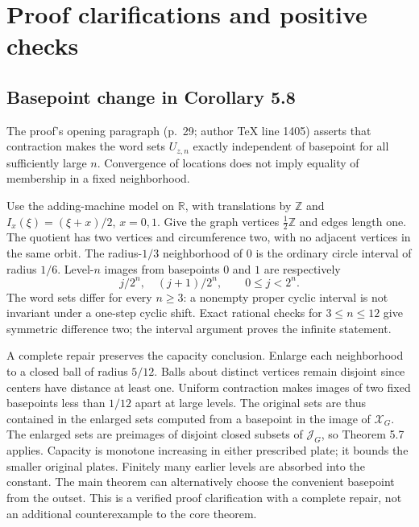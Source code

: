 \documentclass[10pt]{article}
\begin{document}
\section*{Proof clarifications and positive checks}
\subsection*{Basepoint change in Corollary 5.8}
The proof’s opening paragraph (p. 29; author TeX line 1405) asserts that contraction makes the word sets \(U_{z,n}\) exactly independent of basepoint for all sufficiently large \(n\). Convergence of locations does not imply equality of membership in a fixed neighborhood.\par
Use the adding-machine model on \(\mathbb R\), with translations by \(\mathbb Z\) and \(I_x(\xi)=(\xi+x)/2\), \(x=0,1\). Give the graph vertices \(\frac12\mathbb Z\) and edges length one. The quotient has two vertices and circumference two, with no adjacent vertices in the same orbit. The radius-\(1/3\) neighborhood of \(0\) is the ordinary circle interval of radius \(1/6\). Level-\(n\) images from basepoints \(0\) and \(1\) are respectively \[j/2^n,\quad (j+1)/2^n,\qquad 0\le j<2^n.\] The word sets differ for every \(n\ge3\): a nonempty proper cyclic interval is not invariant under a one-step cyclic shift. Exact rational checks for \(3\le n\le12\) give symmetric difference two; the interval argument proves the infinite statement.\par
A complete repair preserves the capacity conclusion. Enlarge each neighborhood to a closed ball of radius \(5/12\). Balls about distinct vertices remain disjoint since centers have distance at least one. Uniform contraction makes images of two fixed basepoints less than \(1/12\) apart at large levels. The original sets are thus contained in the enlarged sets computed from a basepoint in the image of \(\mathcal X_G\). The enlarged sets are preimages of disjoint closed subsets of \(\mathcal J_G\), so Theorem 5.7 applies. Capacity is monotone increasing in either prescribed plate; it bounds the smaller original plates. Finitely many earlier levels are absorbed into the constant. The main theorem can alternatively choose the convenient basepoint from the outset. This is a verified proof clarification with a complete repair, not an additional counterexample to the core theorem.\par
\end{document}

